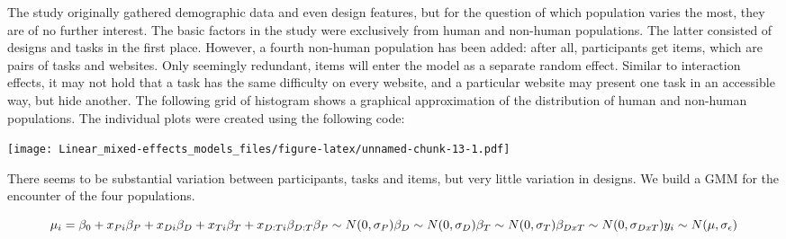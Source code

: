 \documentclass[]{svmono}
\newenvironment{Shaded}{\begin{snugshade}}{\end{snugshade}}
\newcommand{\KeywordTok}[1]{\textcolor[rgb]{0.13,0.29,0.53}{\textbf{#1}}}
\newcommand{\DataTypeTok}[1]{\textcolor[rgb]{0.13,0.29,0.53}{#1}}
\newcommand{\FloatTok}[1]{\textcolor[rgb]{0.00,0.00,0.81}{#1}}
\newcommand{\StringTok}[1]{\textcolor[rgb]{0.31,0.60,0.02}{#1}}
\newcommand{\OperatorTok}[1]{\textcolor[rgb]{0.81,0.36,0.00}{\textbf{#1}}}
\newcommand{\NormalTok}[1]{#1}
\theoremstyle{definition}
\theoremstyle{definition}
\theoremstyle{definition}
\theoremstyle{remark}
\begin{document}
The study originally gathered demographic data and even design features,
but for the question of which population varies the most, they are of no
further interest. The basic factors in the study were exclusively from
human and non-human populations. The latter consisted of designs and
tasks in the first place. However, a fourth non-human population has
been added: after all, participants get items, which are pairs of tasks
and websites. Only seemingly redundant, items will enter the model as a
separate random effect. Similar to interaction effects, it may not hold
that a task has the same difficulty on every website, and a particular
website may present one task in an accessible way, but hide another. The
following grid of histogram shows a graphical approximation of the
distribution of human and non-human populations. The individual plots
were created using the following code:

\begin{Shaded}
\end{Shaded}

\texttt{[image: Linear\_mixed-effects\_models\_files/figure-latex/unnamed-chunk-13-1.pdf]}

There seems to be substantial variation between participants, tasks and
items, but very little variation in designs. We build a GMM for the
encounter of the four populations.

\[
\mu_i = \beta_0 + x_{Pi}\beta_{P} + x_{Di}\beta_{D} + x_{Ti}\beta_{T} + x_{D:Ti}\beta_{D:T}\\
\beta_{P} \sim N(0, \sigma_{P}) \\
\beta_{D} \sim N(0, \sigma_{D}) \\
\beta_{T} \sim N(0, \sigma_{T}) \\
\beta_{DxT} \sim N(0, \sigma_{DxT})\\
y_i \sim N(\mu, \sigma_\epsilon)\]
\end{document}
